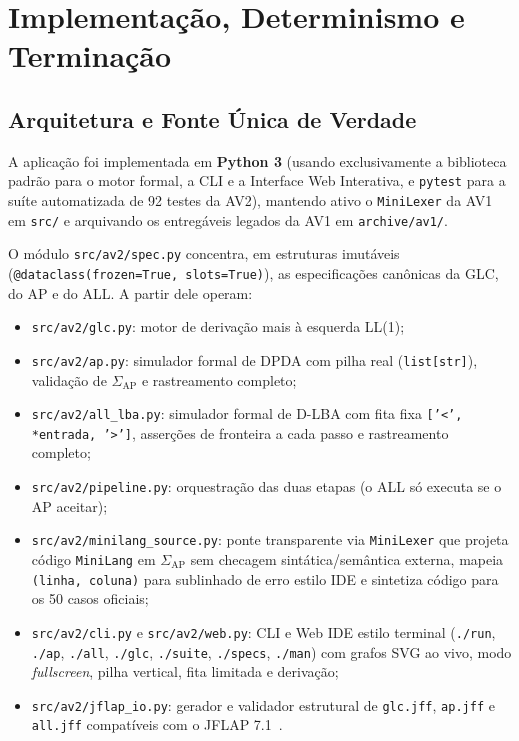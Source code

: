 \section{Implementação, Determinismo e Terminação}

\subsection{Arquitetura e Fonte Única de Verdade}

A aplicação foi implementada em \textbf{Python 3} (usando exclusivamente a biblioteca padrão para o motor formal, a CLI e a Interface Web Interativa, e \texttt{pytest} para a suíte automatizada de 92 testes da AV2), mantendo ativo o \texttt{MiniLexer} da AV1 em \texttt{src/} e arquivando os entregáveis legados da AV1 em \texttt{archive/av1/}.

O módulo \texttt{src/av2/spec.py} concentra, em estruturas imutáveis (\texttt{@dataclass(frozen=True, slots=True)}), as especificações canônicas da GLC, do AP e do ALL. A partir dele operam:
\begin{itemize}
    \item \texttt{src/av2/glc.py}: motor de derivação mais à esquerda LL(1);
    \item \texttt{src/av2/ap.py}: simulador formal de DPDA com pilha real (\texttt{list[str]}), validação de $\Sigma_{\text{AP}}$ e rastreamento completo;
    \item \texttt{src/av2/all\_lba.py}: simulador formal de D-LBA com fita fixa \texttt{['<', *entrada, '>']}, asserções de fronteira a cada passo e rastreamento completo;
    \item \texttt{src/av2/pipeline.py}: orquestração das duas etapas (o ALL só executa se o AP aceitar);
    \item \texttt{src/av2/minilang\_source.py}: ponte transparente via \texttt{MiniLexer} que projeta código \texttt{MiniLang} em $\Sigma_{\text{AP}}$ sem checagem sintática/semântica externa, mapeia \texttt{(linha, coluna)} para sublinhado de erro estilo IDE e sintetiza código para os 50 casos oficiais;
    \item \texttt{src/av2/cli.py} e \texttt{src/av2/web.py}: CLI e Web IDE estilo terminal (\texttt{./run}, \texttt{./ap}, \texttt{./all}, \texttt{./glc}, \texttt{./suite}, \texttt{./specs}, \texttt{./man}) com grafos SVG ao vivo, modo \textit{fullscreen}, pilha vertical, fita limitada e derivação;
    \item \texttt{src/av2/jflap\_io.py}: gerador e validador estrutural de \texttt{glc.jff}, \texttt{ap.jff} e \texttt{all.jff} compatíveis com o JFLAP 7.1~\cite{jflap}.
\end{itemize}

